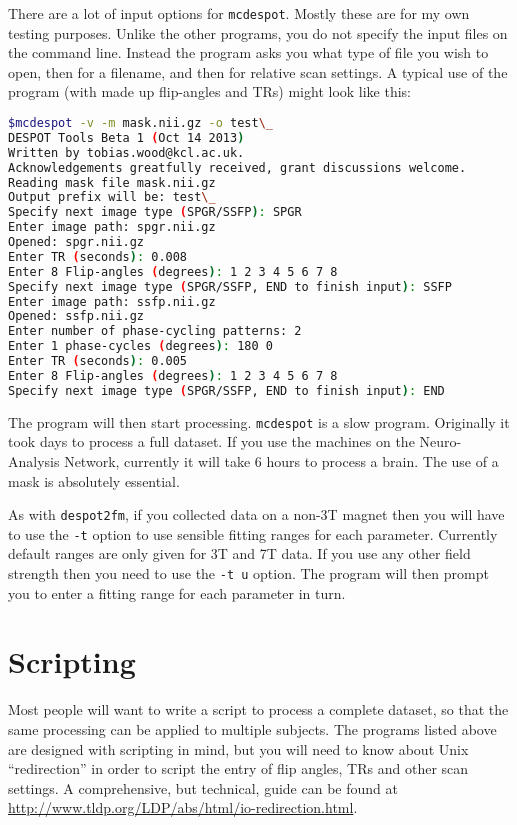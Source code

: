 \documentclass{report}
\begin{document}
There are a lot of input options for \texttt{mcdespot}. Mostly these are for my own testing purposes. Unlike the other programs, you do not specify the input files on the command line. Instead the program asks you what type of file you wish to open, then for a filename, and then for relative scan settings. A typical use of the program (with made up flip-angles and TRs) might look like this:

\begin{lstlisting}[language=sh]
$mcdespot -v -m mask.nii.gz -o test\_
DESPOT Tools Beta 1 (Oct 14 2013)
Written by tobias.wood@kcl.ac.uk. 
Acknowledgements greatfully received, grant discussions welcome.
Reading mask file mask.nii.gz
Output prefix will be: test\_
Specify next image type (SPGR/SSFP): SPGR
Enter image path: spgr.nii.gz
Opened: spgr.nii.gz
Enter TR (seconds): 0.008
Enter 8 Flip-angles (degrees): 1 2 3 4 5 6 7 8
Specify next image type (SPGR/SSFP, END to finish input): SSFP
Enter image path: ssfp.nii.gz
Opened: ssfp.nii.gz
Enter number of phase-cycling patterns: 2
Enter 1 phase-cycles (degrees): 180 0
Enter TR (seconds): 0.005
Enter 8 Flip-angles (degrees): 1 2 3 4 5 6 7 8
Specify next image type (SPGR/SSFP, END to finish input): END
\end{lstlisting}

The program will then start processing. \texttt{mcdespot} is a slow program. Originally it took days to process a full dataset. If you use the machines on the Neuro-Analysis Network, currently it will take 6 hours to process a brain. The use of a mask is absolutely essential.

As with \texttt{despot2fm}, if you collected data on a non-3T magnet then you will have to use the \texttt{-t} option to use sensible fitting ranges for each parameter. Currently default ranges are only given for 3T and 7T data. If you use any other field strength then you need to use the \texttt{-t u} option. The program will then prompt you to enter a fitting range for each parameter in turn.

\section{Scripting}\label{scripting}

Most people will want to write a script to process a complete dataset, so that the same processing can be applied to multiple subjects. The programs listed above are designed with scripting in mind, but you will need to know about Unix ``redirection'' in order to script the entry of flip angles, TRs and other scan settings. A comprehensive, but technical, guide can be found at \url{http://www.tldp.org/LDP/abs/html/io-redirection.html}.
\end{document}
